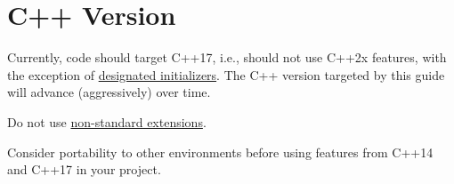 
\chapter{C++ Version}\label{ch:c++-version}
Currently, code should target C++17, i.e., should not use C++2x features, with the exception of \hyperref[sec:designated-initializers]{designated initializers}. The C++ version targeted by this guide will advance (aggressively) over time.

Do not use \hyperref[sec:nonstandard-extensions]{non-standard extensions}.

Consider portability to other environments before using features from C++14 and C++17 in your project.
